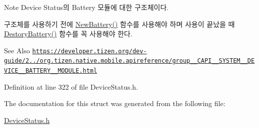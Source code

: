 \begin{DoxyNote}{Note}
Device Status의 Battery 모듈에 대한 구조체이다. \par
 구조체를 사용하기 전에 \hyperlink{DeviceStatus_8h_a0fe7ab1f89e01e459f94bdecce693301}{New\-Battery()} 함수를 사용해야 하며 사용이 끝났을 때 \hyperlink{DeviceStatus_8h_a01b69d107b6708af6900d4279eeff281}{Destory\-Battery()} 함수를 꼭 사용해야 한다. 
\end{DoxyNote}
\begin{DoxySeeAlso}{See Also}
\href{https://developer.tizen.org/dev-guide/2.3.0/org.tizen.native.mobile.apireference/group__CAPI__SYSTEM__DEVICE__BATTERY__MODULE.html}{\tt https\-://developer.\-tizen.\-org/dev-\/guide/2../org.\-tizen.\-native.\-mobile.\-apireference/group\-\_\-\-\_\-\-C\-A\-P\-I\-\_\-\-\_\-\-S\-Y\-S\-T\-E\-M\-\_\-\-\_\-\-D\-E\-V\-I\-C\-E\-\_\-\-\_\-\-B\-A\-T\-T\-E\-R\-Y\-\_\-\-\_\-\-M\-O\-D\-U\-L\-E.\-html} 
\end{DoxySeeAlso}


Definition at line 322 of file Device\-Status.\-h.



The documentation for this struct was generated from the following file\-:\begin{DoxyCompactItemize}
\item 
\hyperlink{DeviceStatus_8h}{Device\-Status.\-h}\end{DoxyCompactItemize}
